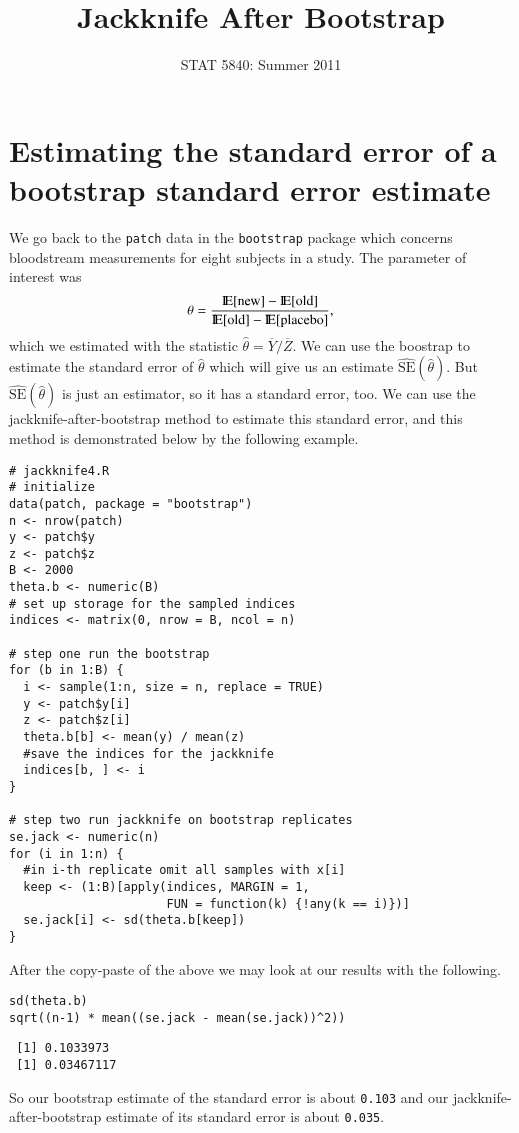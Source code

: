 \documentclass[11pt,english]{article}
\title{Jackknife After Bootstrap}
\date{STAT 5840: Summer 2011}
\begin{document}
\maketitle

\thispagestyle{empty}

\section*{Estimating the standard error of a bootstrap standard error estimate}
\label{sec-1}

We go back to the \texttt{patch} data in the \texttt{bootstrap} package which concerns bloodstream measurements for eight subjects in a study. The parameter of interest was
\[
\theta = \frac{\mathrm{I\hspace{-1.5pt}E}[\mathrm{new}] - \mathrm{I\hspace{-1.5pt}E}[\mathrm{old}]}{\mathrm{I\hspace{-1.5pt}E}[\mathrm{old}] - \mathrm{I\hspace{-1.5pt}E}[\mathrm{placebo}]},
\]
which we estimated with the statistic \(\hat{\theta} = \overline{Y}/\overline{Z}\).  We can use the boostrap to estimate the standard error of $\hat{\theta}$ which will give us an estimate $\widehat{\mathrm{SE}}(\hat{\theta})$.  But $\widehat{\mathrm{SE}}(\hat{\theta})$ is just an estimator, so it has a standard error, too.  We can use the jackknife-after-bootstrap method to estimate this standard error, and this method is demonstrated below by the following example.


\begin{verbatim}
# jackknife4.R
# initialize
data(patch, package = "bootstrap")
n <- nrow(patch)
y <- patch$y
z <- patch$z
B <- 2000
theta.b <- numeric(B)
# set up storage for the sampled indices
indices <- matrix(0, nrow = B, ncol = n)

# step one run the bootstrap
for (b in 1:B) {
  i <- sample(1:n, size = n, replace = TRUE)
  y <- patch$y[i]
  z <- patch$z[i]
  theta.b[b] <- mean(y) / mean(z)
  #save the indices for the jackknife
  indices[b, ] <- i
}

# step two run jackknife on bootstrap replicates
se.jack <- numeric(n)
for (i in 1:n) {
  #in i-th replicate omit all samples with x[i]
  keep <- (1:B)[apply(indices, MARGIN = 1,
                      FUN = function(k) {!any(k == i)})]
  se.jack[i] <- sd(theta.b[keep])
}
\end{verbatim}






After the copy-paste of the above we may look at our results with the following.

\begin{verbatim}
sd(theta.b)
sqrt((n-1) * mean((se.jack - mean(se.jack))^2))
\end{verbatim}




\begin{verbatim}
 [1] 0.1033973
 [1] 0.03467117
\end{verbatim}


So our bootstrap estimate of the standard error is about  \texttt{0.103} and our jackknife-after-bootstrap estimate of its standard error is about  \texttt{0.035}.
\end{document}

